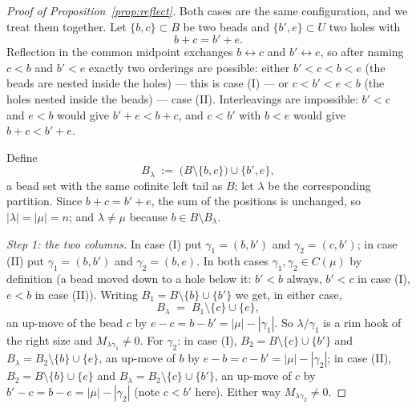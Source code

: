 \documentclass[11pt]{article}
\theoremstyle{definition}
\begin{document}
\begin{proof}[Proof of Proposition~\ref{prop:reflect}]
Both cases are the same configuration, and we treat them together. Let $\{b,c\}\subset B$ be
two beads and $\{b',e\}\subset U$ two holes with
\[
   b+c=b'+e .
\]
Reflection in the common midpoint exchanges $b\leftrightarrow c$ and $b'\leftrightarrow e$, so
after naming $c<b$ and $b'<e$ exactly two orderings are possible: either $b'<c<b<e$ (the beads
are nested inside the holes) --- this is case (I) --- or $c<b'<e<b$ (the holes nested inside
the beads) --- case (II). Interleavings are impossible: $b'<c$ and $e<b$ would give
$b'+e<b+c$, and $c<b'$ with $b<e$ would give $b+c<b'+e$.

Define
\begin{equation}\label{eq:lam}
   B_\lambda \;:=\; \bigl(B\setminus\{b,c\}\bigr)\cup\{b',e\},
\end{equation}
a bead set with the same cofinite left tail as $B$; let $\lambda$ be the corresponding
partition. Since $b+c=b'+e$, the sum of the positions is unchanged, so $|\lambda|=|\mu|=n$;
and $\lambda\ne\mu$ because $b\in B\setminus B_\lambda$.

\smallskip\noindent\emph{Step 1: the two columns.}
In case (I) put $\gamma_1=(b,b')$ and $\gamma_2=(c,b')$; in case (II) put $\gamma_1=(b,b')$
and $\gamma_2=(b,e)$. In both cases $\gamma_1,\gamma_2\in C(\mu)$ by definition (a bead moved
down to a hole below it: $b'<b$ always, $b'<c$ in case (I), $e<b$ in case (II)). Writing
$B_1=B\setminus\{b\}\cup\{b'\}$ we get, in either case,
\[
   B_\lambda \;=\; B_1\setminus\{c\}\cup\{e\},
\]
an up-move of the bead $c$ by $e-c=b-b'=|\mu|-|\gamma_1|$. So $\lambda/\gamma_1$ is a rim hook
of the right size and $M_{\lambda\gamma_1}\ne0$. For $\gamma_2$:
in case (I), $B_2=B\setminus\{c\}\cup\{b'\}$ and $B_\lambda=B_2\setminus\{b\}\cup\{e\}$, an
up-move of $b$ by $e-b=c-b'=|\mu|-|\gamma_2|$;
in case (II), $B_2=B\setminus\{b\}\cup\{e\}$ and $B_\lambda=B_2\setminus\{c\}\cup\{b'\}$, an
up-move of $c$ by $b'-c=b-e=|\mu|-|\gamma_2|$ (note $c<b'$ here). Either way
$M_{\lambda\gamma_2}\ne0$.


\end{proof}
\end{document}
